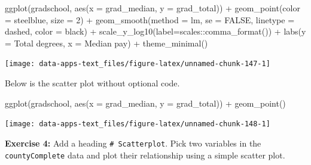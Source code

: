 \documentclass[
]{book}
\makeatletter
\newenvironment{Shaded}{\begin{snugshade}}{\end{snugshade}}
\newcommand{\AttributeTok}[1]{\textcolor[rgb]{0.61,0.61,0.61}{#1}}
\newcommand{\ConstantTok}[1]{\textcolor[rgb]{0,0,0}{#1}}
\newcommand{\DecValTok}[1]{\textcolor[rgb]{0.06,0.06,0.06}{#1}}
\newcommand{\FunctionTok}[1]{\textcolor[rgb]{0,0,0}{#1}}
\newcommand{\NormalTok}[1]{#1}
\newcommand{\SpecialCharTok}[1]{\textcolor[rgb]{0,0,0}{#1}}
\newcommand{\StringTok}[1]{\textcolor[rgb]{0.5,0.5,0.5}{#1}}
\newenvironment{kframe}{%
\medskip{}
\setlength{\fboxsep}{.8em}
 \def\at@end@of@kframe{}%
 \ifinner\ifhmode%
  \def\at@end@of@kframe{\end{minipage}}%
  \begin{minipage}{\columnwidth}%
 \fi\fi%
 \def\FrameCommand##1{\hskip\@totalleftmargin \hskip-\fboxsep
 \colorbox{shadecolor}{##1}\hskip-\fboxsep
     \hskip-\linewidth \hskip-\@totalleftmargin \hskip\columnwidth}%
 \MakeFramed {\advance\hsize-\width
   \@totalleftmargin\z@ \linewidth\hsize
   \@setminipage}}%
 {\par\unskip\endMakeFramed%
 \at@end@of@kframe}
\renewenvironment{Shaded}{\begin{kframe}}{\end{kframe}}
\newenvironment{rmdblock}[1]
  {\begin{shaded*}
  }
  {\end{shaded*}
  }
\newenvironment{learncheck}
  {\begin{rmdblock}{warning}}
  {\end{rmdblock}}
\makeatother
\begin{document}
\begin{Shaded}
\begin{Highlighting}[]
\FunctionTok{ggplot}\NormalTok{(gradschool, }\FunctionTok{aes}\NormalTok{(}\AttributeTok{x =}\NormalTok{ grad\_median, }\AttributeTok{y =}\NormalTok{ grad\_total)) }\SpecialCharTok{+}
  \FunctionTok{geom\_point}\NormalTok{(}\AttributeTok{color =} \StringTok{\textquotesingle{}steelblue\textquotesingle{}}\NormalTok{, }\AttributeTok{size =} \DecValTok{2}\NormalTok{) }\SpecialCharTok{+}
  \FunctionTok{geom\_smooth}\NormalTok{(}\AttributeTok{method =} \StringTok{\textquotesingle{}lm\textquotesingle{}}\NormalTok{, }\AttributeTok{se =} \ConstantTok{FALSE}\NormalTok{, }
              \AttributeTok{linetype =} \StringTok{\textquotesingle{}dashed\textquotesingle{}}\NormalTok{, }\AttributeTok{color =} \StringTok{\textquotesingle{}black\textquotesingle{}}\NormalTok{) }\SpecialCharTok{+}
  \FunctionTok{scale\_y\_log10}\NormalTok{(}\AttributeTok{label=}\NormalTok{scales}\SpecialCharTok{::}\FunctionTok{comma\_format}\NormalTok{()) }\SpecialCharTok{+}
  \FunctionTok{labs}\NormalTok{(}\AttributeTok{y =} \StringTok{\textquotesingle{}Total degrees\textquotesingle{}}\NormalTok{,}
       \AttributeTok{x =} \StringTok{\textquotesingle{}Median pay\textquotesingle{}}\NormalTok{) }\SpecialCharTok{+}
  \FunctionTok{theme\_minimal}\NormalTok{()}
\end{Highlighting}
\end{Shaded}

\begin{center}\texttt{[image: data-apps-text\_files/figure-latex/unnamed-chunk-147-1]} \end{center}

Below is the scatter plot without optional code.

\begin{Shaded}
\begin{Highlighting}[]
\FunctionTok{ggplot}\NormalTok{(gradschool, }\FunctionTok{aes}\NormalTok{(}\AttributeTok{x =}\NormalTok{ grad\_median, }\AttributeTok{y =}\NormalTok{ grad\_total)) }\SpecialCharTok{+}
  \FunctionTok{geom\_point}\NormalTok{()}
\end{Highlighting}
\end{Shaded}

\begin{center}\texttt{[image: data-apps-text\_files/figure-latex/unnamed-chunk-148-1]} \end{center}

\begin{learncheck}
\textbf{Exercise 4:} Add a heading \texttt{\#\ Scatterplot}. Pick two
variables in the \texttt{countyComplete} data and plot their
relationship using a simple scatter plot.
\end{learncheck}
\end{document}

